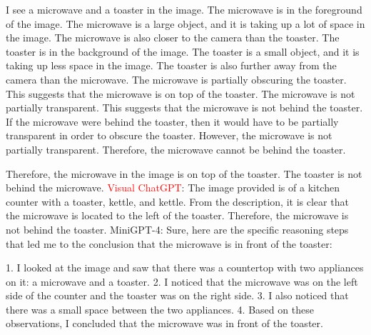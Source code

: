 \begin{enumerate}
    I see a microwave and a toaster in the image.
    The microwave is in the foreground of the image. The microwave is a large object, and it is taking up a lot of space in the image. The microwave is also closer to the camera than the toaster.
    The toaster is in the background of the image. The toaster is a small object, and it is taking up less space in the image. The toaster is also further away from the camera than the microwave.
    The microwave is partially obscuring the toaster. This suggests that the microwave is on top of the toaster.
    The microwave is not partially transparent. This suggests that the microwave is not behind the toaster.
    If the microwave were behind the toaster, then it would have to be partially transparent in order to obscure the toaster. However, the microwave is not partially transparent. Therefore, the microwave cannot be behind the toaster.

    Therefore, the microwave in the image is on top of the toaster. The toaster is not behind the microwave.
    \subitem \textcolor{red}{Visual ChatGPT}: 
    The image provided is of a kitchen counter with a toaster, kettle, and kettle. From the description, it is clear that the microwave is located to the left of the toaster. Therefore, the microwave is not behind the toaster.
    \subitem MiniGPT-4: Sure, here are the specific reasoning steps that led me to the conclusion that the microwave is in front of the toaster:

    1. I looked at the image and saw that there was a countertop with two appliances on it: a microwave and a toaster.
    2. I noticed that the microwave was on the left side of the counter and the toaster was on the right side.
    3. I also noticed that there was a small space between the two appliances.
    4. Based on these observations, I concluded that the microwave was in front of the toaster.
\end{enumerate}
